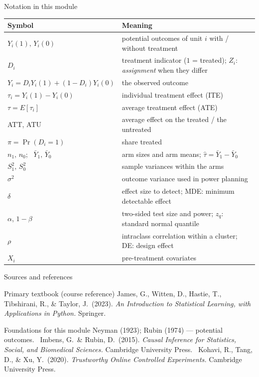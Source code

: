 \documentclass[aspectratio=169,11pt]{beamer}
\begin{document}
\begin{frame}{Notation in this module}
  \footnotesize
  \begin{center}
  \begin{tabular}{@{}ll@{}}
    \toprule
    \textbf{Symbol} & \textbf{Meaning} \\
    \midrule
    $Y_i(1),\,Y_i(0)$ & potential outcomes of unit $i$ with / without treatment \\
    $D_i$ & treatment indicator ($1$ = treated); $Z_i$: \emph{assignment} when they differ \\
    $Y_i = D_iY_i(1)+(1-D_i)Y_i(0)$ & the observed outcome \\
    $\tau_i = Y_i(1)-Y_i(0)$ & individual treatment effect (ITE) \\
    $\tau = E[\tau_i]$ & average treatment effect (ATE) \\
    ATT, ATU & average effect on the treated / the untreated \\
    $\pi = \Pr(D_i=1)$ & share treated \\
    $n_1,\,n_0$; \ $\bar Y_1,\,\bar Y_0$ & arm sizes and arm means; $\hat\tau=\bar Y_1-\bar Y_0$ \\
    $S_1^2,\,S_0^2$ & sample variances within the arms \\
    $\sigma^2$ & outcome variance used in power planning \\
    $\delta$ & effect size to detect; MDE: minimum detectable effect \\
    $\alpha$, $1-\beta$ & two-sided test size and power; $z_q$: standard normal quantile \\
    $\rho$ & intraclass correlation within a cluster; DE: design effect \\
    $X_i$ & pre-treatment covariates \\
    \bottomrule
  \end{tabular}
  \end{center}
\end{frame}

\begin{frame}{Sources and references}
  \begin{block}{Primary textbook (course reference)}
    James, G., Witten, D., Hastie, T., Tibshirani, R., \& Taylor, J.\ (2023).
    \emph{An Introduction to Statistical Learning, with Applications in
    Python.} Springer.
  \end{block}
  \begin{block}{Foundations for this module}
    Neyman (1923); Rubin (1974) --- potential outcomes. \
    Imbens, G.\ \& Rubin, D.\ (2015). \emph{Causal Inference for Statistics, Social, and
    Biomedical Sciences.} Cambridge University Press. \
    Kohavi, R., Tang, D., \& Xu, Y.\ (2020). \emph{Trustworthy Online Controlled
    Experiments.} Cambridge University Press.
  \end{block}
\end{frame}
\end{document}
